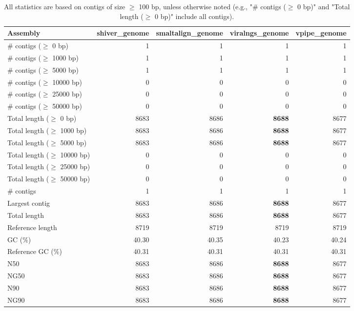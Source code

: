 \documentclass[12pt,a4paper]{article}
\begin{document}
\begin{table}[ht]
\begin{center}
\caption{All statistics are based on contigs of size $\geq$ 100 bp, unless otherwise noted (e.g., "\# contigs ($\geq$ 0 bp)" and "Total length ($\geq$ 0 bp)" include all contigs).}
\begin{tabular}{|l*{4}{|r}|}
\hline
Assembly & shiver\_genome & smaltalign\_genome & viralngs\_genome & vpipe\_genome \\ \hline
\# contigs ($\geq$ 0 bp) & 1 & 1 & 1 & 1 \\ \hline
\# contigs ($\geq$ 1000 bp) & 1 & 1 & 1 & 1 \\ \hline
\# contigs ($\geq$ 5000 bp) & 1 & 1 & 1 & 1 \\ \hline
\# contigs ($\geq$ 10000 bp) & 0 & 0 & 0 & 0 \\ \hline
\# contigs ($\geq$ 25000 bp) & 0 & 0 & 0 & 0 \\ \hline
\# contigs ($\geq$ 50000 bp) & 0 & 0 & 0 & 0 \\ \hline
Total length ($\geq$ 0 bp) & 8683 & 8686 & {\bf 8688} & 8677 \\ \hline
Total length ($\geq$ 1000 bp) & 8683 & 8686 & {\bf 8688} & 8677 \\ \hline
Total length ($\geq$ 5000 bp) & 8683 & 8686 & {\bf 8688} & 8677 \\ \hline
Total length ($\geq$ 10000 bp) & 0 & 0 & 0 & 0 \\ \hline
Total length ($\geq$ 25000 bp) & 0 & 0 & 0 & 0 \\ \hline
Total length ($\geq$ 50000 bp) & 0 & 0 & 0 & 0 \\ \hline
\# contigs & 1 & 1 & 1 & 1 \\ \hline
Largest contig & 8683 & 8686 & {\bf 8688} & 8677 \\ \hline
Total length & 8683 & 8686 & {\bf 8688} & 8677 \\ \hline
Reference length & 8719 & 8719 & 8719 & 8719 \\ \hline
GC (\%) & 40.30 & 40.35 & 40.23 & 40.24 \\ \hline
Reference GC (\%) & 40.31 & 40.31 & 40.31 & 40.31 \\ \hline
N50 & 8683 & 8686 & {\bf 8688} & 8677 \\ \hline
NG50 & 8683 & 8686 & {\bf 8688} & 8677 \\ \hline
N90 & 8683 & 8686 & {\bf 8688} & 8677 \\ \hline
NG90 & 8683 & 8686 & {\bf 8688} & 8677 \\ \hline

\end{tabular}
\end{center}
\end{table}
\end{document}

